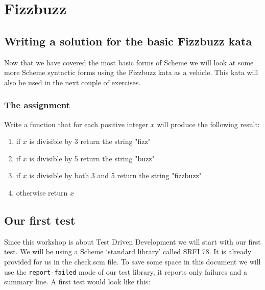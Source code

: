 \documentclass[12pt,a4paper,english,twoside]{article}
\begin{document}
\section{Fizzbuzz}
\subsection{Writing a solution for the basic Fizzbuzz kata}
Now that we have covered the most basic forms of Scheme we will look at some 
more Scheme syntactic forms using the Fizzbuzz kata as a vehicle. This kata 
will also be used in the next couple of exercises.
\subsubsection{The assignment}
Write a function that for each positive integer $x$ will produce the following 
result:
\begin{enumerate}
  \item if $x$ is divisible by 3 return the string "fizz"
  \item if $x$ is divisible by 5 return the string "buzz"
  \item if $x$ is divisible by both 3 and 5 return the string "fizzbuzz"
  \item otherwise return $x$
\end{enumerate}
\subsection{Our first test}
Since this workshop is about Test Driven Development we will start with our 
first test. We will be using a Scheme `standard library' called SRFI 78. It is 
already provided for us in the check.scm file. To save some space in this 
document we will use the \texttt{report-failed} mode of our test library, it 
reports only failures and a summary line. A first test would look like this:
\end{document}
